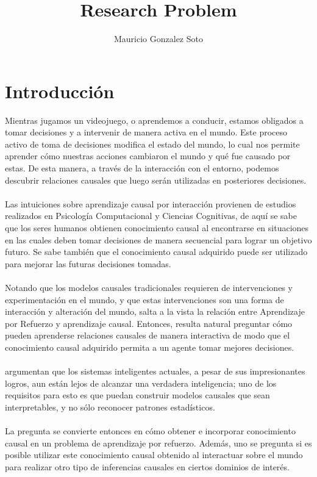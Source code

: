 \documentclass[11pt]{article}
\title{Research Problem}
\author{Mauricio Gonzalez Soto}
\theoremstyle{plain}
\begin{document}
\maketitle
\tableofcontents
\section{Introducción}
Mientras jugamos un videojuego, o aprendemos a conducir, estamos obligados a tomar decisiones y a intervenir de manera activa en el mundo. Este proceso activo de toma de decisiones modifica el estado del mundo, lo cual nos permite aprender cómo nuestras acciones cambiaron el mundo y qué fue causado por estas. De esta manera, a través de la interacción con el entorno, podemos descubrir relaciones causales que luego serán utilizadas en posteriores decisiones.\\
\\
 Las intuiciones sobre aprendizaje causal por interacción provienen de estudios realizados en Psicología Computacional y Ciencias Cognitivas, de aquí se sabe que los seres humanos obtienen conocimiento causal al encontrarse en situaciones en las cuales deben tomar decisiones de manera secuencial para lograr un objetivo futuro. Se sabe también que el conocimiento causal adquirido puede ser utilizado para mejorar las futuras decisiones tomadas.\\
\\
Notando que los modelos causales tradicionales requieren de intervenciones y experimentación en el mundo, y que estas intervenciones son una forma de interacción y alteración del mundo, salta a la vista la relación entre Aprendizaje por Refuerzo y aprendizaje causal. Entonces, resulta natural preguntar cómo pueden aprenderse relaciones causales de manera interactiva de modo que el conocimiento causal adquirido permita a un agente tomar mejores decisiones.\\
\\
\cite{lake2017building} argumentan que los sistemas inteligentes actuales, a pesar de sus impresionantes logros, aun están lejos de alcanzar una verdadera inteligencia; uno de los requisitos para esto es que puedan construir modelos causales que sean interpretables, y no sólo reconocer patrones estadísticos.\\
\\
La pregunta se convierte entonces en cómo obtener e incorporar conocimiento causal en un problema de aprendizaje por refuerzo. Además, uno se pregunta si es posible utilizar este conocimiento causal obtenido al interactuar sobre el mundo para realizar otro tipo de inferencias causales en ciertos dominios de interés.
\end{document}
